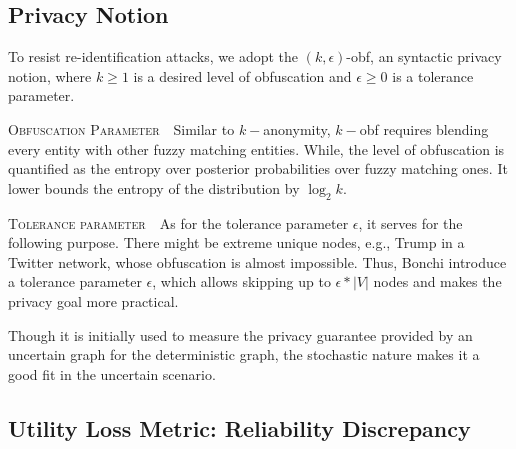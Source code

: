 \subsection{Privacy Notion}
\label{sec:privacyNotion}
To resist re-identification attacks, we adopt the $(k,\epsilon)$-obf, an syntactic privacy notion,
 where $k \ge 1$ is a desired level of obfuscation  and $\epsilon \ge 0$ is a tolerance parameter. 

\textsc{Obfuscation Parameter}~~Similar to $k-$anonymity, $k-$obf requires blending every entity with other fuzzy matching entities. While, the level of obfuscation is quantified as the entropy over posterior probabilities over fuzzy matching ones. It lower bounds the entropy of the distribution by $\log_{2} k$. 

\textsc{Tolerance parameter}~~As for the tolerance parameter $\epsilon$, it serves for the following purpose. There might be extreme unique nodes, e.g., Trump in a Twitter network, whose obfuscation is almost impossible. Thus, Bonchi {\etal} introduce a tolerance parameter $\epsilon$, which allows skipping up to $\epsilon * |V|$ nodes and makes the privacy goal more practical. 

Though it is initially used to measure the privacy guarantee provided by an uncertain graph for the  deterministic graph, the stochastic nature makes it a good fit in the uncertain scenario. 
\vspace{-20pt}
\subsection{Utility Loss Metric: Reliability Discrepancy}

